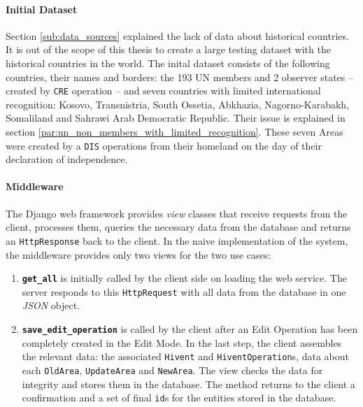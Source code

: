 \paragraph{Initial Dataset} %
\label{par:initial_dataset}

Section \ref{sub:data_sources} explained the lack of data about historical countries. It is out of the scope of this thesis to create a large testing dataset with the historical countries in the world. The inital dataset consists of the following countries, their names and borders: the 193 UN members and 2 observer states -- created by \texttt{CRE} operation -- and seven countries with limited international recognition: Kosovo, Transnistria, South Ossetia, Abkhazia, Nagorno-Karabakh, Somaliland and Sahrawi Arab Democratic Republic. Their issue is explained in section \ref{par:un_non_members_with_limited_recognition}. These seven Areas were created by a \texttt{DIS} operations from their homeland on the day of their declaration of independence.


\paragraph{Middleware} %
\label{par:middleware}

The Django web framework provides \emph{view} classes that receive requests from the client, processes them, queries the necessary data from the database and returns an \texttt{HttpResponse} back to the client. In the naive implementation of the system, the middleware provides only two views for the two use cases:

\begin{enumerate}
  \item \textbf{\texttt{get\_all}} is initially called by the client side on loading the web service. The server responds to this \texttt{HttpRequest} with all data from the database in one \emph{JSON} object.
  \item \textbf{\texttt{save\_edit\_operation}} is called by the client after an Edit Operation has been completely created in the Edit Mode. In the last step, the client assembles the relevant data: the associated \texttt{Hivent} and \texttt{HiventOperation}s, data about each \texttt{OldArea}, \texttt{UpdateArea} and \texttt{NewArea}. The view checks the data for integrity and stores them in the database. The method returns to the client a confirmation and a set of final \texttt{id}s for the entities stored in the database.
\end{enumerate}

